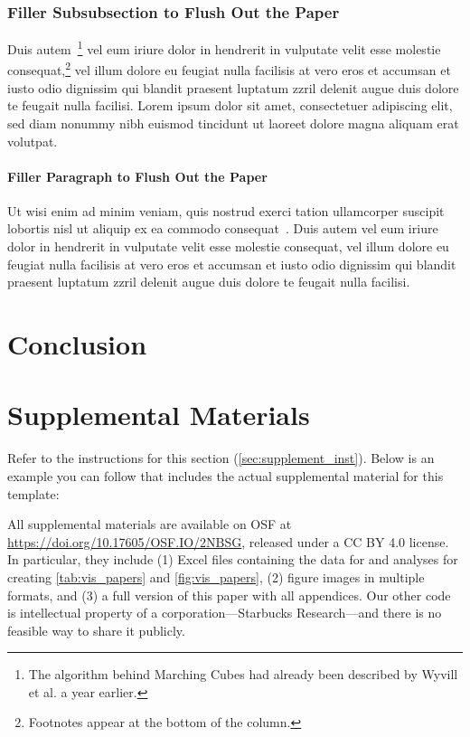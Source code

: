 \documentclass[review]{vgtc}                 %
\begin{document}
\subsubsection{Filler Subsubsection to Flush Out the Paper}

Duis autem~\cite{Lorensen:1987:MCA}\footnote{The algorithm behind
Marching Cubes \cite{Lorensen:1987:MCA} had already been
described by Wyvill et al. \cite{Wyvill:1986:DSS} a year
earlier.} vel eum iriure dolor in hendrerit
in vulputate velit esse molestie consequat,\footnote{Footnotes
appear at the bottom of the column.} vel illum dolore eu
feugiat nulla facilisis at vero eros et accumsan et iusto odio
dignissim qui blandit praesent luptatum zzril delenit augue duis
dolore te feugait nulla facilisi. Lorem ipsum dolor sit amet,
consectetuer adipiscing elit, sed diam nonummy nibh euismod tincidunt
ut laoreet dolore magna aliquam erat volutpat.


\paragraph{Filler Paragraph to Flush Out the Paper}

Ut wisi enim ad minim veniam, quis nostrud exerci tation ullamcorper
suscipit lobortis nisl ut aliquip ex ea commodo
consequat~\cite{Nielson:1991:TAD}. Duis autem vel eum iriure dolor in
hendrerit in vulputate velit esse molestie consequat, vel illum dolore
eu feugiat nulla facilisis at vero eros et accumsan et iusto odio
dignissim qui blandit praesent luptatum zzril delenit augue duis
dolore te feugait nulla facilisi.


\section{Conclusion}

\lipsum[1]%

\section*{Supplemental Materials}
\label{sec:supplemental_materials}

Refer to the instructions for this section (\cref{sec:supplement_inst}).
Below is an example you can follow that includes the actual supplemental material for this template:

All supplemental materials are available on OSF at \url{https://doi.org/10.17605/OSF.IO/2NBSG}, released under a CC BY 4.0 license.
In particular, they include (1) Excel files containing the data for and analyses for creating \cref{tab:vis_papers} and \cref{fig:vis_papers}, (2) figure images in multiple formats, and (3) a full version of this paper with all appendices.
Our other code is intellectual property of a corporation---Starbucks Research---and there is no feasible way to share it publicly.
\end{document}

